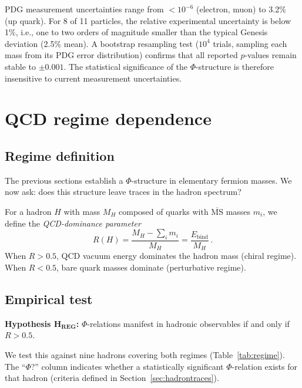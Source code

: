\documentclass[11pt,a4paper]{article}
\begin{document}
PDG measurement uncertainties range from $< 10^{-6}$ (electron,
muon) to 3.2\% (up quark). For 8 of 11 particles, the relative
experimental uncertainty is below 1\%, i.e., one to two orders of
magnitude smaller than the typical Genesis deviation (2.5\% mean).
A bootstrap resampling test ($10^4$ trials, sampling each mass from
its PDG error distribution) confirms that all reported $p$-values
remain stable to $\pm 0.001$. The statistical significance of the
$\Phi$-structure is therefore insensitive to current measurement
uncertainties.

\section{QCD regime dependence}
\label{sec:regime}

\subsection{Regime definition}
\label{sec:regimedef}

The previous sections establish a $\Phi$-structure in elementary
fermion masses. We now ask: does this structure leave traces in the
hadron spectrum?

For a hadron $H$ with mass $M_H$ composed of quarks with
$\overline{\text{MS}}$ masses $m_i$, we define the
\emph{QCD-dominance parameter}
\begin{equation}
  R(H) = \frac{M_H - \sum_i m_i}{M_H}
  = \frac{E_\text{bind}}{M_H}\,.
  \label{eq:regime}
\end{equation}
When $R > 0.5$, QCD vacuum energy dominates the hadron mass
(chiral regime). When $R < 0.5$, bare quark masses dominate
(perturbative regime).

\subsection{Empirical test}
\label{sec:regimetest}

\textbf{Hypothesis $\mathbf{H_\text{REG}}$:}
$\Phi$-relations manifest in hadronic observables if and only if
$R > 0.5$.

We test this against nine hadrons covering both regimes
(Table~\ref{tab:regime}). The ``$\Phi$?'' column indicates whether
a statistically significant $\Phi$-relation exists for that hadron
(criteria defined in Section~\ref{sec:hadrontraces}).
\end{document}
